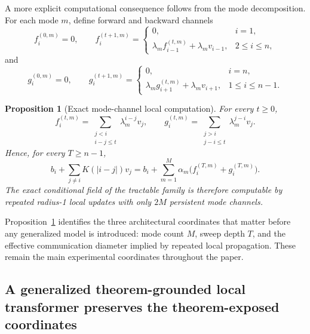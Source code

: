 \documentclass[11pt]{article}
\newtheorem{proposition}{Proposition}
\theoremstyle{definition}
\begin{document}
A more explicit computational consequence follows from the mode decomposition. For each mode \(m\), define forward and backward channels
\begin{equation}
f_i^{(0,m)}=0,\qquad
f_i^{(t+1,m)}=
\begin{cases}
0,& i=1,\\
\lambda_m f_{i-1}^{(t,m)}+\lambda_m v_{i-1},& 2\le i\le n,
\end{cases}
\label{eq:forward-mode}
\end{equation}
and
\begin{equation}
g_i^{(0,m)}=0,\qquad
g_i^{(t+1,m)}=
\begin{cases}
0,& i=n,\\
\lambda_m g_{i+1}^{(t,m)}+\lambda_m v_{i+1},& 1\le i\le n-1.
\end{cases}
\label{eq:backward-mode}
\end{equation}

\begin{proposition}[Exact mode-channel local computation]
\label{prop:mode-channel}
For every \(t\ge 0\),
\begin{equation}
f_i^{(t,m)}=\sum_{\substack{j<i\\ i-j\le t}}\lambda_m^{i-j}v_j,
\qquad
g_i^{(t,m)}=\sum_{\substack{j>i\\ j-i\le t}}\lambda_m^{j-i}v_j.
\label{eq:mode-partial-sums}
\end{equation}
Hence, for every \(T\ge n-1\),
\begin{equation}
b_i+\sum_{j\neq i}K(|i-j|)v_j
=
b_i+\sum_{m=1}^{M}\alpha_m\bigl(f_i^{(T,m)}+g_i^{(T,m)}\bigr).
\label{eq:exact-mode-field}
\end{equation}
The exact conditional field of the tractable family is therefore computable by repeated radius-1 local updates with only \(2M\) persistent mode channels.
\end{proposition}

Proposition~\ref{prop:mode-channel} identifies the three architectural coordinates that matter before any generalized model is introduced: mode count \(M\), sweep depth \(T\), and the effective communication diameter implied by repeated local propagation. These remain the main experimental coordinates throughout the paper.

\subsection*{A generalized theorem-grounded local transformer preserves the theorem-exposed coordinates}
\end{document}
